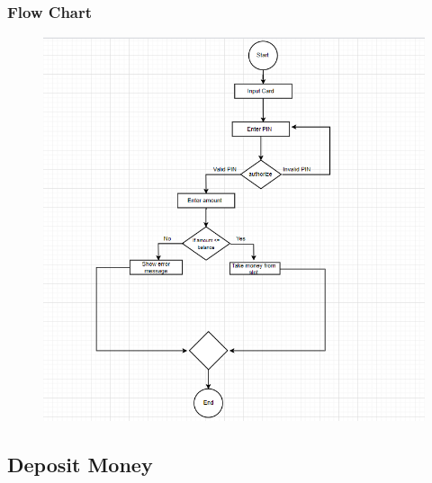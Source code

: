\documentclass{article}
\begin{document}
		\newpage\subsubsection{Flow Chart}
		\begin{figure}[h!]
			\begin{center}
				\includegraphics[height=\linewidth]{img/withdraw_flowchart.png}
			\end{center}
		\end{figure}
	\newpage\subsection{Deposit Money}
\end{document}

